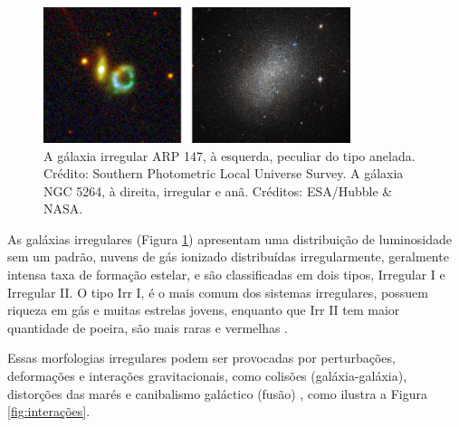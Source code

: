 \begin{figure}[!h] 
  \centering 
  \includegraphics[width=0.8\textwidth]{Imagens/irregulares.png} 
  \caption[Gálaxia ARP 147 e gálaxia NGC 5264.]{A gálaxia irregular ARP 147, à esquerda, peculiar do tipo anelada. Crédito: Southern Photometric Local Universe Survey. A gálaxia NGC 5264, à direita, irregular e anã. Créditos: ESA/Hubble \& NASA.}
  \label{fig:irregulares} 
\end{figure}

As galáxias irregulares (Figura \ref{fig:irregulares}) apresentam uma distribuição de luminosidade sem um padrão, nuvens de gás ionizado distribuídas irregularmente, geralmente intensa taxa de formação estelar, e são classificadas em dois tipos, Irregular I e Irregular II. O tipo Irr I, é o mais comum dos sistemas irregulares, possuem riqueza em gás e muitas estrelas jovens, enquanto que Irr II tem maior quantidade de poeira, são mais raras e vermelhas \cite{2009soares, 2022gastao}.

Essas morfologias irregulares podem ser provocadas por perturbações, deformações e interações gravitacionais, como colisões (galáxia-galáxia), distorções das marés e canibalismo galáctico (fusão) \cite{2023Muller, 2022gastao}, como ilustra a Figura \ref{fig:interações}.

